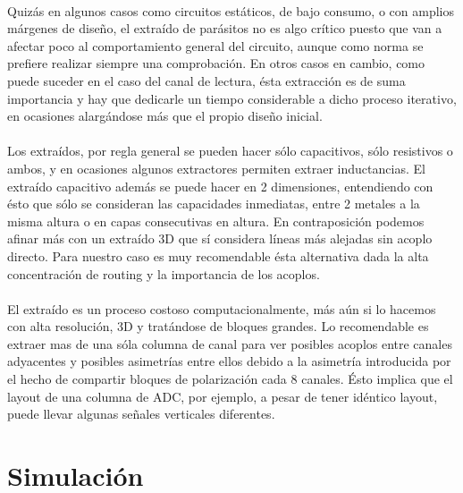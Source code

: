 \paragraph{}
Quizás en algunos casos como circuitos estáticos, de bajo consumo, o con amplios
márgenes de diseño, el extraído de parásitos no es algo crítico puesto que van a
afectar poco al comportamiento general del circuito, aunque como norma se prefiere
realizar siempre una comprobación. En otros casos en cambio, como puede suceder
en el caso del canal de lectura, ésta extracción es de suma importancia y hay
que dedicarle un tiempo considerable a dicho proceso iterativo, en ocasiones
alargándose más que el propio diseño inicial.

\paragraph{}
Los extraídos, por regla general se pueden hacer sólo capacitivos, sólo resistivos
o ambos, y en ocasiones algunos extractores permiten extraer inductancias. El extraído
capacitivo además se puede hacer en 2 dimensiones, entendiendo con ésto que sólo
se consideran las capacidades inmediatas, entre 2 metales a la misma altura o
en capas consecutivas en altura. En contraposición podemos afinar más con un
extraído 3D que sí considera líneas más alejadas sin acoplo directo. Para nuestro
caso es muy recomendable ésta alternativa dada la alta concentración de routing y
la importancia de los acoplos.

\paragraph{}
El extraído es un proceso costoso computacionalmente, más aún si lo hacemos con alta
resolución, 3D y tratándose de bloques grandes. Lo recomendable es extraer mas de una
sóla columna de canal para ver posibles acoplos entre canales adyacentes y posibles
asimetrías entre ellos debido a la asimetría introducida por el hecho de compartir
bloques de polarización cada 8 canales. Ésto implica que el layout de una columna
de ADC, por ejemplo, a pesar de tener idéntico layout, puede llevar algunas señales
verticales diferentes.

\section{Simulación}\label{cap:simulacion}
